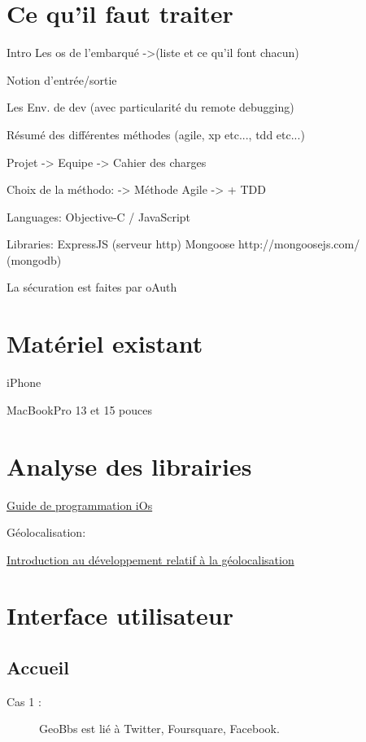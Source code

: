 \documentclass[a4paper,12pt]{report}
\begin{document}
\begin{onehalfspace}
\chapter*{Ce qu'il faut traiter}
Intro
  Les os de l'embarqué
  ->(liste et ce qu'il font chacun)

  Notion d'entrée/sortie

  Les Env. de dev (avec particularité du remote debugging)

  Résumé des différentes méthodes (agile, xp etc..., tdd etc...)

Projet
  -> Equipe
  -> Cahier des charges

Choix de la méthodo:
  -> Méthode Agile
  -> + TDD

Languages:
Objective-C / JavaScript

Libraries:
ExpressJS (serveur http)
Mongoose http://mongoosejs.com/ (mongodb)

La sécuration est faites par oAuth

\chapter*{Matériel existant}
iPhone

MacBookPro 13 et 15 pouces

\chapter*{Analyse des librairies}

\href{http://developer.apple.com/library/ios/documentation/iPhone/Conceptual/iPhoneOSProgrammingGuide/index.html}{Guide de programmation iOs}

Géolocalisation:

\href{http://developer.apple.com/library/ios/documentation/UserExperience/Conceptual/LocationAwarenessPG/Introduction/Introduction.html}{Introduction au développement relatif à la géolocalisation}

\chapter*{Interface utilisateur}
  \section*{Accueil}
  \begin{description}
    \item[Cas 1 :] GeoBbs est lié à Twitter, Foursquare, Facebook.


\end{description}
\end{onehalfspace}
\end{document}
